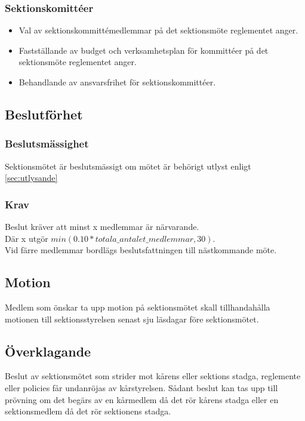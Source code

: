 \subsubsection{Sektionskomittéer}
\begin{itemize}
	\item Val av sektionskommittémedlemmar på det sektionsmöte reglementet anger.
	\item Fastställande av budget och verksamhetsplan för kommittéer på det sektionsmöte reglementet anger. 
	\item Behandlande av ansvarsfrihet för sektionskommittéer.
\end{itemize}

\subsection{Beslutförhet}

\subsubsection{Beslutsmässighet}
Sektionsmötet är beslutsmässigt om mötet är behörigt utlyst enligt \ref{sec:utlysande}

\subsubsection{Krav}
Beslut kräver att minst x medlemmar är närvarande. \\
Där x utgör $min(0.10 * totala\_antalet\_medlemmar, 30)$. \\
Vid färre medlemmar bordlägs beslutsfattningen till nästkommande möte.

\subsection{Motion}
Medlem som önskar ta upp motion på sektionsmötet skall tillhandahålla motionen till sektionsstyrelsen senast sju läsdagar före sektionsmötet.

\subsection{Överklagande}
Beslut av sektionsmötet som strider mot kårens eller sektions stadga, reglemente eller policies får undanröjas av kårstyrelsen. Sådant beslut kan tas upp till prövning om det begärs av en kårmedlem då det rör kårens stadga eller en sektionsmedlem då det rör sektionens stadga.

